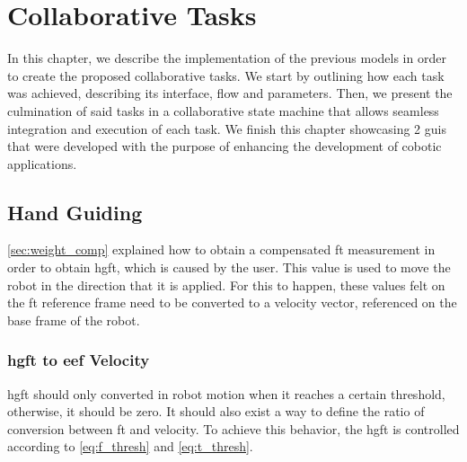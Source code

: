 \chapter{Collaborative Tasks}
\label{chp:5-tasks}

\par In this chapter, we describe the implementation of the previous models in order to create the proposed collaborative tasks. We start by outlining how each task was achieved, describing its interface, flow and parameters. Then, we present the culmination of said tasks in a collaborative state machine that allows seamless integration and execution of each task. We finish this chapter showcasing 2 \acp{gui} that were developed with the purpose of enhancing the development of cobotic applications.





\section{Hand Guiding}

\par \autoref{sec:weight_comp} explained how to obtain a compensated \ac{ft} measurement in order to obtain \acf{hgft}, which is caused by the user. This value is used to move the robot in the direction that it is applied. For this to happen, these values felt on the \ac{ft} reference frame need to be converted to a velocity vector, referenced on the base frame of the robot. 



\subsection{\ac{hgft} to \ac{eef} Velocity}
\label{ssec:ft_to_eef}

\par \ac{hgft} should only converted in robot motion when it reaches a certain threshold, otherwise, it should be zero. It should also exist a way to define the ratio of conversion between \ac{ft} and velocity. To achieve this behavior, the \ac{hgft} is controlled according to \autoref{eq:f_thresh} and \autoref{eq:t_thresh}.

